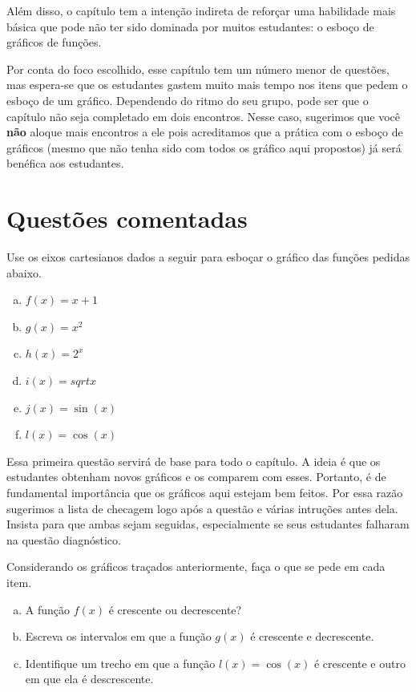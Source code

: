 \documentclass[main_estudante.tex]{subfiles}
\begin{document}
Além disso, o capítulo tem a intenção indireta de reforçar uma habilidade mais básica que pode não ter sido dominada por muitos estudantes: o esboço de gráficos de funções.

Por conta do foco escolhido, esse capítulo tem um número menor de questões, mas espera-se que os estudantes gastem muito mais tempo nos itens que pedem o esboço de um gráfico. Dependendo do ritmo do seu grupo, pode ser que o capítulo não seja completado em dois encontros. Nesse caso, sugerimos que você \textbf{não} aloque mais encontros a ele pois acreditamos que a prática com o esboço de gráficos (mesmo que não tenha sido com todos os gráfico aqui propostos) já será benéfica aos estudantes.

\section{Questões comentadas}

\begin{questao}
Use os eixos cartesianos dados a seguir para  esboçar o gráfico das funções pedidas abaixo.
\begin{enumerate}[a)]
\item $f(x)=x+1$
\item $g(x)=x^2$
\item $h(x)=2^x$
\item $i(x)=sqrt{x}$
\item $j(x)=\sin(x)$
\item $l(x)=\cos(x)$
\end{enumerate}
\end{questao}

Essa primeira questão servirá de base para todo o capítulo. A ideia é que os estudantes obtenham novos gráficos e os comparem com esses. Portanto, é de fundamental importância que os gráficos aqui estejam bem feitos. Por essa razão sugerimos a lista de checagem logo após a questão e várias intruções antes dela. Insista para que ambas sejam seguidas, especialmente se seus estudantes falharam na questão diagnóstico.

\begin{questao}
Considerando os gráficos traçados anteriormente, faça o que se pede em cada item.
\begin{enumerate}[a)]
\item A função $f(x)$ é crescente ou decrescente?
\item Escreva os intervalos em que a função $g(x)$ é crescente e decrescente.
\item Identifique um trecho em que a função $l(x)=\cos(x)$ é crescente e outro em que ela é descrescente.
\end{enumerate}
\end{questao}
\end{document}
